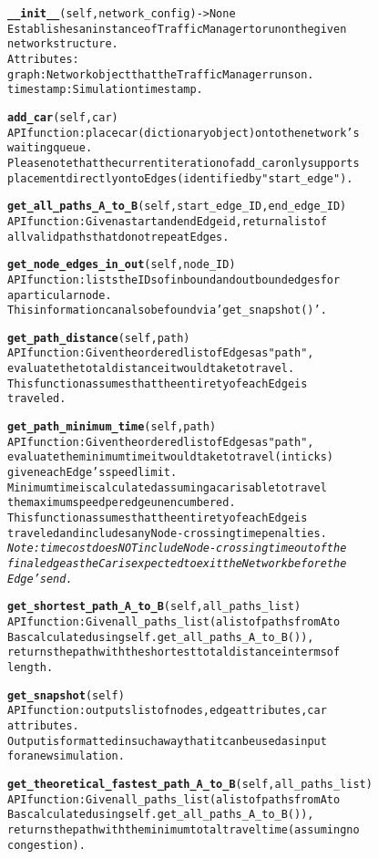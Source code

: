 \begin{alltt}
\textbf{__init__}(self, network_config) -> None
Establishes an instance of TrafficManager to run on the given 
network structure.
Attributes:
    graph:  Network object that the TrafficManager runs on.
    timestamp:  Simulation timestamp.

\textbf{add_car}(self, car)
API function:  place car (dictionary object) onto the network's 
waiting queue.
Please note that the current iteration of add_car only supports 
placement directly onto Edges (identified by "start_edge").

\textbf{get_all_paths_A_to_B}(self, start_edge_ID, end_edge_ID)
API function:  Given a start and end Edge id, return a list of 
all valid paths that do not repeat Edges.

\textbf{get_node_edges_in_out}(self, node_ID)
API function:  lists the IDs of inbound and outbound edges for 
a particular node.
This information can also be found via 'get_snapshot()'.

\textbf{get_path_distance}(self, path)
API function:  Given the ordered list of Edges as "path", 
evaluate the total distance it would take to travel.
This function assumes that the entirety of each Edge is 
traveled.

\textbf{get_path_minimum_time}(self, path)
API function:  Given the ordered list of Edges as "path", 
evaluate the minimum time it would take to travel (in ticks) 
given each Edge's speed limit.
Minimum time is calculated assuming a car is able to travel 
the maximum speed per edge unencumbered.
This function assumes that the entirety of each Edge is 
traveled and includes any Node-crossing time penalties.
\textit{Note:  time cost does NOT include Node-crossing time out of the 
final edge as the Car is expected to exit the Network before the 
Edge's end.}

\textbf{get_shortest_path_A_to_B}(self, all_paths_list)
API function:  Given all_paths_list (a list of paths from A to 
B as calculated using self.get_all_paths_A_to_B()),
returns the path with the shortest total distance in terms of 
length.

\textbf{get_snapshot}(self)
API function:  outputs list of nodes, edge attributes, car 
attributes.
Output is formatted in such a way that it can be used as input 
for a new simulation.

\textbf{get_theoretical_fastest_path_A_to_B}(self, all_paths_list)
API function:  Given all_paths_list (a list of paths from A to 
B as calculated using self.get_all_paths_A_to_B()),
returns the path with the minimum total travel time (assuming no
congestion).


\end{alltt}
